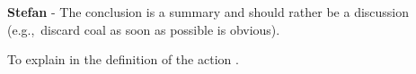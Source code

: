 \documentclass[12pt,a4paper]{article}
\def\eg{e.g.,\ }
\begin{document}
\begin{mdframed}[style=comment] %
{\color{teal} \textbf{Stefan}} - The conclusion is a summary and should rather be a discussion (\eg discard coal as soon as possible is obvious).
\end{mdframed}

\noindent To explain in the definition of the action {\color{blue} }. 

\begin{mdframed}[style=manuscript] %

\end{mdframed}


\clearpage
\def\bibfont{\scriptsize}

\normalsize
\end{document}
